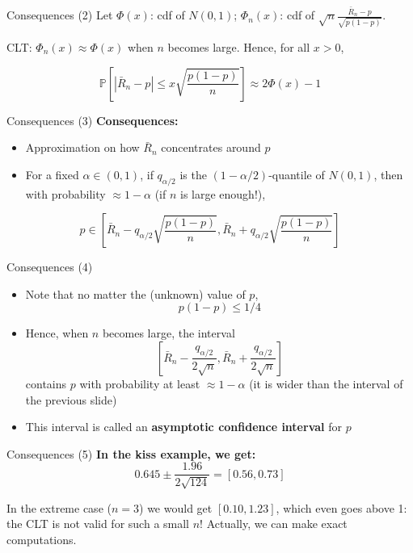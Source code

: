 \documentclass[aspectratio=169]{beamer}
\begin{document}
\begin{frame}{Consequences (2)}
Let $\Phi(x)$: cdf of $N(0, 1)$; $\Phi_n(x)$: cdf of $\sqrt{n}\frac{\bar{R}_n - p}{\sqrt{p(1-p)}}$.

\vspace{0.3cm}

CLT: $\Phi_n(x) \approx \Phi(x)$ when $n$ becomes large. Hence, for all $x > 0$,

\[\mathbb{P}\left[|\bar{R}_n - p| \leq x\sqrt{\frac{p(1-p)}{n}}\right] \approx 2\Phi(x) - 1\]
\end{frame}

\begin{frame}{Consequences (3)}
\textbf{Consequences:}
\begin{itemize}
    \item Approximation on how $\bar{R}_n$ concentrates around $p$
    \item For a fixed $\alpha \in (0, 1)$, if $q_{\alpha/2}$ is the $(1 - \alpha/2)$-quantile of $N(0, 1)$, then with probability $\approx 1 - \alpha$ (if $n$ is large enough!),
\end{itemize}

\[p \in \left[\bar{R}_n - q_{\alpha/2}\sqrt{\frac{p(1-p)}{n}}, \bar{R}_n + q_{\alpha/2}\sqrt{\frac{p(1-p)}{n}}\right]\]
\end{frame}

\begin{frame}{Consequences (4)}
\begin{itemize}
    \item Note that no matter the (unknown) value of $p$,
    \[p(1-p) \leq 1/4\]

    \item Hence, when $n$ becomes large, the interval
    \[\left[\bar{R}_n - \frac{q_{\alpha/2}}{2\sqrt{n}}, \bar{R}_n + \frac{q_{\alpha/2}}{2\sqrt{n}}\right]\]
    contains $p$ with probability at least $\approx 1 - \alpha$ (it is wider than the interval of the previous slide)

    \item This interval is called an \textbf{asymptotic confidence interval} for $p$
\end{itemize}
\end{frame}

\begin{frame}{Consequences (5)}
\textbf{In the kiss example, we get:}
\[0.645 \pm \frac{1.96}{2\sqrt{124}} = [0.56, 0.73]\]

\vspace{0.5cm}

In the extreme case ($n = 3$) we would get $[0.10, 1.23]$, which even goes above 1: the CLT is not valid for such a small $n$! Actually, we can make exact computations.
\end{frame}
\end{document}
